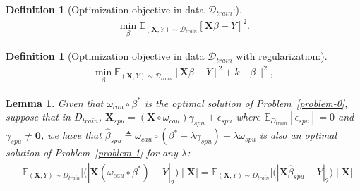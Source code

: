 \documentclass{article}
\theoremstyle{plain}
\newtheorem{lemma}[theorem]{Lemma}
\theoremstyle{definition}
\newtheorem{definition}[theorem]{Definition}
\theoremstyle{remark}
\begin{document}
\begin{definition}[Optimization objective in data $\mathcal{D}_{train}$:]
\begin{align}
    \min_{\beta} \mathbb{E}_{(\textbf{X},Y)\sim\mathcal{D}_{train}}[\textbf{X}\beta-Y]^2. 
\end{align}
\end{definition}

\begin{definition}[Optimization objective in data $\mathcal{D}_{train}$ with regularization:]
\begin{align}
    \min_{\beta} \mathbb{E}_{(\textbf{X},Y)\sim\mathcal{D}_{train}}[\textbf{X}\beta-Y]^2+k\|\beta\|^2,
\end{align}
\end{definition}

\begin{lemma}
Given that $\omega_{cau}\circ\beta^*$ is the optimal solution of Problem~\ref{problem-0},
suppose that in $D_{train}$, $\textbf{X}_{spu}=(\textbf{X}\circ\omega_{cau})\gamma_{spu}+\epsilon_{spu}$ where $\mathbb{E}_{D_{train}}[\epsilon_{spu}]=0$ and $\gamma_{spu}\neq\textbf{0}$, we have that $\hat{\beta}_{spu}\triangleq\omega_{cau}\circ(\beta^*-\lambda\gamma_{spu})+\lambda\omega_{spu}$ is also an optimal solution of Problem~\ref{problem-1} for any $\lambda$:
\begin{align*}
    &\mathbb{E}_{(\textbf{X},Y)\sim D_{train}}\Big[\Big(|\textbf{X}(\omega_{cau}\circ\beta^*)-Y|_2\Big)\mid \textbf{X}\Big]
    =\mathbb{E}_{(\textbf{X},Y)\sim D_{train}}\Big[\Big(|\textbf{X}\hat{\beta}_{spu}-Y|_2\Big)\mid \textbf{X}\Big]
\end{align*}
\end{lemma}
\end{document}
